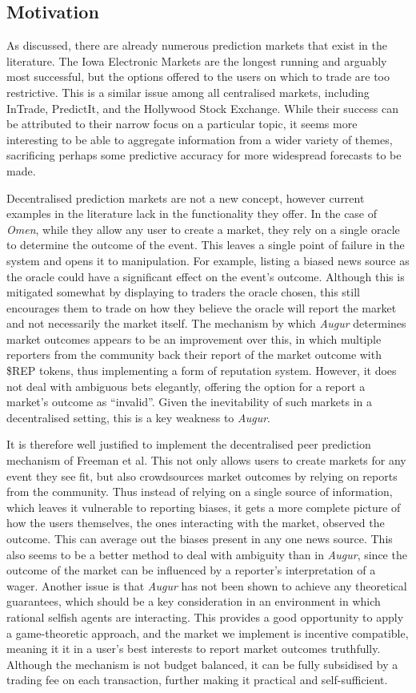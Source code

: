 \subsection{Motivation}

As discussed, there are already numerous prediction markets that exist in the
literature. The Iowa Electronic Markets are the longest running and arguably
most successful, but the options offered to the users on which to trade are too
restrictive. This is a similar issue among all centralised markets, including
InTrade, PredictIt, and the Hollywood Stock Exchange. While their success can
be attributed to their narrow focus on a particular topic, it seems more
interesting to be able to aggregate information from a wider variety of themes,
sacrificing perhaps some predictive accuracy for more widespread forecasts to
be made.

Decentralised prediction markets are not a new concept, however current
examples in the literature lack in the functionality they offer. In the case of
\emph{Omen}, while they allow any user to create a market, they rely on a
single oracle to determine the outcome of the event. This leaves a single point
of failure in the system and opens it to manipulation. For example, listing a
biased news source as the oracle could have a significant effect on the event's
outcome. Although this is mitigated somewhat by displaying to traders the
oracle chosen, this still encourages them to trade on how they believe the
oracle will report the market and not necessarily the market itself. The
mechanism by which \emph{Augur} determines market outcomes appears to be an
improvement over this, in which multiple reporters from the community back
their report of the market outcome with \$REP tokens, thus implementing a form
of reputation system. However, it does not deal with ambiguous bets elegantly,
offering the option for a report a market's outcome as ``invalid''.  Given the
inevitability of such markets in a decentralised setting, this is a key
weakness to \emph{Augur}.

It is therefore well justified to implement the decentralised peer prediction
mechanism of Freeman et al. This not only allows users to create markets for
any event they see fit, but also crowdsources market outcomes by relying on
reports from the community. Thus instead of relying on a single source of
information, which leaves it vulnerable to reporting biases, it gets a more
complete picture of how the users themselves, the ones interacting with the
market, observed the outcome. This can average out the biases present in any
one news source. This also seems to be a better method to deal with ambiguity
than in \emph{Augur}, since the outcome of the market can be influenced by a
reporter's interpretation of a wager. Another issue is that \emph{Augur} has
not been shown to achieve any theoretical guarantees, which should be a key
consideration in an environment in which rational selfish agents are
interacting. This provides a good opportunity to apply a game-theoretic
approach, and the market we implement is incentive compatible, meaning it it in
a user's best interests to report market outcomes truthfully. Although the
mechanism is not budget balanced, it can be fully subsidised by a trading fee
on each transaction, further making it practical and self-sufficient.
